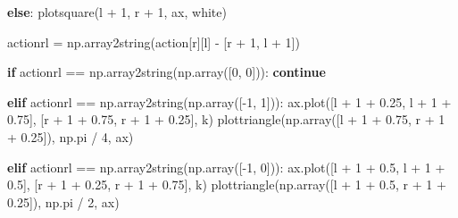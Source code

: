 \documentclass[
]{article}
\newenvironment{Shaded}{\begin{snugshade}}{\end{snugshade}}
\newcommand{\ControlFlowTok}[1]{\textcolor[rgb]{0.00,0.23,0.31}{\textbf{#1}}}
\newcommand{\DecValTok}[1]{\textcolor[rgb]{0.68,0.00,0.00}{#1}}
\newcommand{\FloatTok}[1]{\textcolor[rgb]{0.68,0.00,0.00}{#1}}
\newcommand{\NormalTok}[1]{\textcolor[rgb]{0.00,0.23,0.31}{#1}}
\newcommand{\OperatorTok}[1]{\textcolor[rgb]{0.37,0.37,0.37}{#1}}
\newcommand{\StringTok}[1]{\textcolor[rgb]{0.13,0.47,0.30}{#1}}
\begin{document}
\begin{Shaded}
\begin{Highlighting}[]
            \ControlFlowTok{else}\NormalTok{:}
\NormalTok{                plotsquare(l }\OperatorTok{+} \DecValTok{1}\NormalTok{, r }\OperatorTok{+} \DecValTok{1}\NormalTok{, ax, }\StringTok{\textquotesingle{}white\textquotesingle{}}\NormalTok{)}
                
\NormalTok{                actionrl }\OperatorTok{=}\NormalTok{ np.array2string(action[r][l] }\OperatorTok{{-}}\NormalTok{ [r }\OperatorTok{+} \DecValTok{1}\NormalTok{, l }\OperatorTok{+} \DecValTok{1}\NormalTok{])}
                                
                \ControlFlowTok{if}\NormalTok{ actionrl }\OperatorTok{==}\NormalTok{ np.array2string(np.array([}\DecValTok{0}\NormalTok{, }\DecValTok{0}\NormalTok{])):}
                    \ControlFlowTok{continue}

                \ControlFlowTok{elif}\NormalTok{ actionrl }\OperatorTok{==}\NormalTok{ np.array2string(np.array([}\OperatorTok{{-}}\DecValTok{1}\NormalTok{, }\DecValTok{1}\NormalTok{])):}
\NormalTok{                    ax.plot([l }\OperatorTok{+} \DecValTok{1} \OperatorTok{+} \FloatTok{0.25}\NormalTok{, l }\OperatorTok{+} \DecValTok{1} \OperatorTok{+} \FloatTok{0.75}\NormalTok{], [r }\OperatorTok{+} \DecValTok{1} \OperatorTok{+} \FloatTok{0.75}\NormalTok{, r }\OperatorTok{+} \DecValTok{1} \OperatorTok{+} \FloatTok{0.25}\NormalTok{], }\StringTok{\textquotesingle{}k\textquotesingle{}}\NormalTok{)}
\NormalTok{                    plottriangle(np.array([l }\OperatorTok{+} \DecValTok{1} \OperatorTok{+} \FloatTok{0.75}\NormalTok{, r }\OperatorTok{+} \DecValTok{1} \OperatorTok{+} \FloatTok{0.25}\NormalTok{]), np.pi }\OperatorTok{/} \DecValTok{4}\NormalTok{, ax)}

                \ControlFlowTok{elif}\NormalTok{ actionrl }\OperatorTok{==}\NormalTok{ np.array2string(np.array([}\OperatorTok{{-}}\DecValTok{1}\NormalTok{, }\DecValTok{0}\NormalTok{])):}
\NormalTok{                    ax.plot([l }\OperatorTok{+} \DecValTok{1} \OperatorTok{+} \FloatTok{0.5}\NormalTok{, l }\OperatorTok{+} \DecValTok{1} \OperatorTok{+} \FloatTok{0.5}\NormalTok{], [r }\OperatorTok{+} \DecValTok{1} \OperatorTok{+} \FloatTok{0.25}\NormalTok{, r }\OperatorTok{+} \DecValTok{1} \OperatorTok{+} \FloatTok{0.75}\NormalTok{], }\StringTok{\textquotesingle{}k\textquotesingle{}}\NormalTok{)}
\NormalTok{                    plottriangle(np.array([l }\OperatorTok{+} \DecValTok{1} \OperatorTok{+} \FloatTok{0.5}\NormalTok{, r }\OperatorTok{+} \DecValTok{1} \OperatorTok{+} \FloatTok{0.25}\NormalTok{]), np.pi }\OperatorTok{/} \DecValTok{2}\NormalTok{, ax)}


\end{Highlighting}
\end{Shaded}
\end{document}
